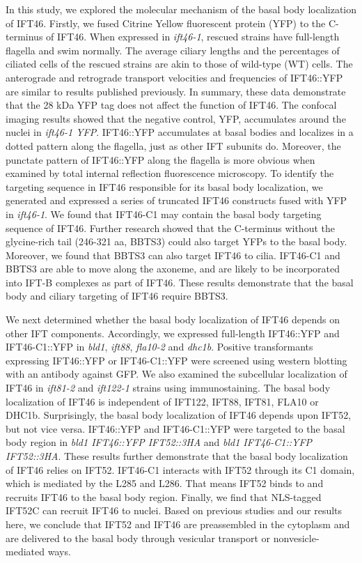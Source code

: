 In this study, we explored the molecular mechanism of the basal body localization of IFT46. Firstly, we fused Citrine Yellow fluorescent protein (YFP) to the C-terminus of IFT46. When expressed in \textit{ift46-1}, rescued strains have full-length flagella and swim normally. The average ciliary lengths and the percentages of ciliated cells of the rescued strains are akin to those of wild-type (WT) cells. The anterograde and retrograde transport velocities and frequencies of IFT46::YFP are similar to results published previously. In summary, these data demonstrate that the 28 kDa YFP tag does not affect the function of IFT46. The confocal imaging results showed that the negative control, YFP, accumulates around the nuclei in \textit{ift46-1 YFP}. IFT46::YFP accumulates at basal bodies and localizes in a dotted pattern along the flagella, just as other IFT subunits do. Moreover, the punctate pattern of IFT46::YFP along the flagella is more obvious when examined by total internal reflection fluorescence microscopy.  To identify the targeting sequence in IFT46 responsible for its basal body localization, we generated and expressed a series of truncated IFT46 constructs fused with YFP in \textit{ift46-1}. We found that IFT46-C1 may contain the basal body targeting sequence of IFT46. Further research showed that the C-terminus without the glycine-rich tail (246-321 aa, BBTS3) could also target YFPs to the basal body. Moreover, we found that BBTS3 can also target IFT46 to cilia. IFT46-C1 and BBTS3 are able to move along the axoneme, and are
likely to be incorporated into IFT-B complexes as part of IFT46. These results demonstrate that the basal body and ciliary targeting of IFT46 require BBTS3.

We next determined whether the basal body localization of IFT46 depends on other IFT components. Accordingly, we expressed full-length IFT46::YFP and IFT46-C1::YFP in \textit{bld1}, \textit{ift88}, \textit{fla10-2} and \textit{dhc1b}. Positive transformants expressing IFT46::YFP or IFT46-C1::YFP were screened using western blotting with an antibody against GFP. We also examined the subcellular localization of IFT46 in \textit{ift81-2} and \textit{ift122-1} strains using immunostaining. The basal body localization of IFT46 is independent of IFT122, IFT88, IFT81, FLA10 or DHC1b. Surprisingly, the basal body localization of IFT46 depends upon IFT52, but not vice versa. IFT46::YFP and IFT46-C1::YFP were targeted to the basal body region in \textit{bld1 IFT46::YFP IFT52::3HA} and \textit{bld1 IFT46-C1::YFP IFT52::3HA}. These results further demonstrate that the basal body localization of IFT46 relies on IFT52. IFT46-C1 interacts with IFT52 through its C1 domain, which is mediated by the L285 and L286. That means IFT52 binds to and recruits IFT46 to the basal body region. Finally, we find that NLS-tagged IFT52C can recruit IFT46 to nuclei. Based on previous studies and our results here, we conclude that IFT52 and IFT46 are preassembled in the cytoplasm and are delivered to the basal body through vesicular transport or nonvesicle-mediated ways.

